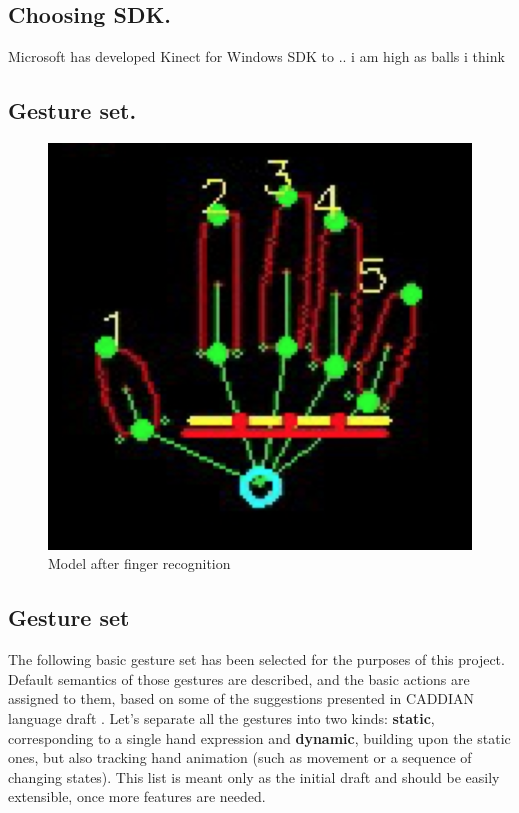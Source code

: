 \documentclass[a4paper,11pt,oneside]{article}
\begin{document}
\subsection{Choosing SDK.}

Microsoft has developed Kinect for Windows SDK to ..
i am high as balls i think

\subsection{Gesture set.}

 \begin{figure}[H]
  \centering
  \includegraphics[scale=0.7]{hand-recognized.png}
  \caption{Model after finger recognition}
  \end{figure}
 
  \subsection{Gesture set}
	
    The following basic gesture set has been selected for the purposes of this project. Default semantics of those gestures are described, and the basic actions are assigned to them, based on some of the suggestions presented in CADDIAN language draft \cite{AB01}. Let's separate all the gestures into two kinds: \textbf{static}, corresponding to a single hand expression and \textbf{dynamic},  building upon the static ones, but also tracking hand animation (such as movement or a sequence of changing states). This list is meant only as the initial draft and should be easily extensible, once more features are needed.
    
\end{document}
